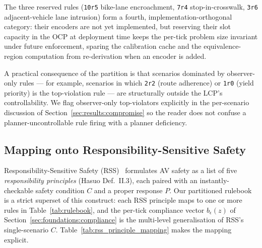 The three reserved rules (\texttt{10r5} bike-lane encroachment, \texttt{7r4} stop-in-crosswalk, \texttt{3r6} adjacent-vehicle lane intrusion) form a fourth, implementation-orthogonal category: their encoders are not yet implemented, but reserving their slot capacity in the OCP at deployment time keeps the per-tick problem size invariant under future enforcement, sparing the calibration cache and the equivalence-region computation from re-derivation when an encoder is added.

A practical consequence of the partition is that scenarios dominated by observer-only rules --- for example, scenarios in which \texttt{2r2} (route adherence) or \texttt{1r0} (yield priority) is the top-violation rule --- are structurally outside the LCP's controllability. We flag observer-only top-violators explicitly in the per-scenario discussion of Section~\ref{sec:results:compromise} so the reader does not confuse a planner-uncontrollable rule firing with a planner deficiency.

\subsection{Mapping onto Responsibility-Sensitive Safety}
\label{sec:rulebook:rss-mapping}

Responsibility-Sensitive Safety (RSS)~\cite{shalev2017rss,hasuo2022rss,ieee2846} formulates AV safety as a list of five \emph{responsibility principles} (Hasuo Def.~II.3), each paired with an instantly-checkable safety condition $C$ and a proper response $P$. Our partitioned rulebook is a strict superset of this construct: each RSS principle maps to one or more rules in Table~\ref{tab:rulebook}, and the per-tick compliance vector $b_{\epsilon}(z)$ of Section~\ref{sec:foundations:compliance} is the multi-level generalisation of RSS's single-scenario $C$. Table~\ref{tab:rss_principle_mapping} makes the mapping explicit.

